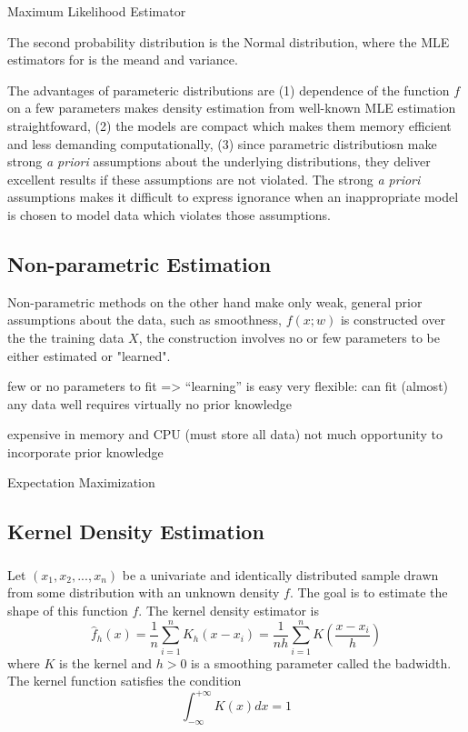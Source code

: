 Maximum Likelihood Estimator

The second probability distribution is the Normal distribution, where the MLE estimators for is the meand and variance.

The advantages of parameteric distributions are (1) dependence of the function $f$ on a few parameters makes density estimation from well-known MLE estimation straightfoward, (2) the models are compact which makes them memory efficient and less demanding computationally, (3) since parametric distributiosn make strong \emph{a priori} assumptions about the underlying distributions, they deliver excellent results if these assumptions are not violated.  The strong \emph{a priori} assumptions makes it difficult to express ignorance when an inappropriate model is chosen to model data which violates those assumptions.

\subsection{Non-parametric Estimation}
Non-parametric methods on the other hand make only weak, general prior assumptions about the data, such as smoothness, $f(x;w)$ is constructed over the the training data $X$, the construction involves no or few parameters to be either estimated or "learned".

few or no parameters to fit => “learning” is easy
very flexible: can fit (almost) any data well
requires virtually no prior knowledge

expensive in memory and CPU (must store all data)
not much opportunity to incorporate prior knowledge

Expectation Maximization

\subsection{Kernel Density Estimation}
\subsubsection{}
Let $(x_1,x_2,...,x_n)$ be a univariate and identically distributed sample drawn from some distribution with an unknown density $f$.
The goal is to estimate the shape of this function $f$.  The kernel density estimator is
\begin{equation}
  \hat{f}_h(x)=\frac{1}{n}\sum_{i=1}^{n}K_h(x-x_i)
    =\frac{1}{nh}\sum_{i=1}^{n}K\left(\frac{x-x_i}{h}\right)
\end{equation}
where $K$ is the kernel and $h>0$ is a smoothing parameter called the badwidth.  The kernel function satisfies the condition
\begin{equation}
  \int_{-\infty}^{+\infty}K(x)dx=1
\end{equation}
